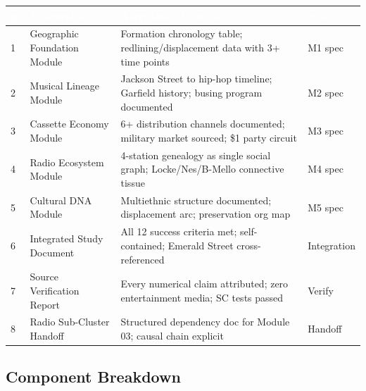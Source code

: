 \documentclass[11pt,letterpaper]{article}
\newcommand{\tableheader}[1]{\textbf{\sffamily\textcolor{white}{#1}}}
\begin{document}
\begin{center}
\begin{tabularx}{\textwidth}{C{0.5cm}L{3.5cm}X L{2cm}}
\toprule
{}
\tableheader{\#} & \tableheader{Deliverable} & \tableheader{Acceptance Criteria} & \tableheader{Spec} \\
 & Geographic Foundation Module & Formation chronology table; redlining/displacement data with 3+ time points & M1 spec \\
2 & Musical Lineage Module & Jackson Street to hip-hop timeline; Garfield history; busing program documented & M2 spec \\
3 & Cassette Economy Module & 6+ distribution channels documented; military market sourced; \$1 party circuit & M3 spec \\
4 & Radio Ecosystem Module & 4-station genealogy as single social graph; Locke/Nes/B-Mello connective tissue & M4 spec \\
5 & Cultural DNA Module & Multiethnic structure documented; displacement arc; preservation org map & M5 spec \\
6 & Integrated Study Document & All 12 success criteria met; self-contained; Emerald Street cross-referenced & Integration \\
7 & Source Verification Report & Every numerical claim attributed; zero entertainment media; SC tests passed & Verify \\
8 & Radio Sub-Cluster Handoff & Structured dependency doc for Module 03; causal chain explicit & Handoff \\
\bottomrule
\end{tabularx}
\end{center}

\subsection{Component Breakdown}
\end{document}
